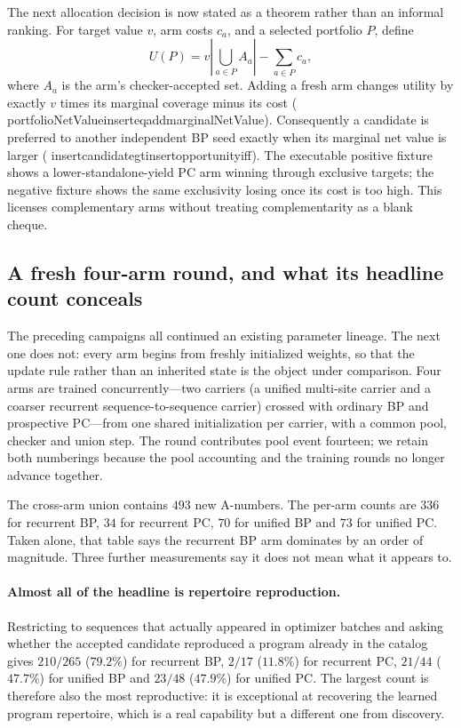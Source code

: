 \documentclass[11pt]{article}
\newcommand{\leanname}[1]{{\scriptsize\ttfamily
  \def\_{\textunderscore\allowbreak}#1}}
\begin{document}
The next allocation decision is now stated as a theorem rather than an informal ranking.
For target value $v$, arm costs $c_a$, and a selected portfolio $P$, define
\[
 U(P)=v\left|\bigcup_{a\in P}A_a\right|-\sum_{a\in P}c_a,
\]
where $A_a$ is the arm's checker-accepted set. Adding a fresh arm changes utility by
exactly $v$ times its marginal coverage minus its cost
(\leanname{portfolioNetValue\_insert\_eq\_add\_marginalNetValue}).
Consequently a candidate is preferred to another independent BP seed exactly when its
marginal net value is larger
(\leanname{insert\_candidate\_gt\_insert\_opportunity\_iff}).
The executable positive fixture shows a lower-standalone-yield PC arm winning through
exclusive targets; the negative fixture shows the same exclusivity losing once its cost
is too high. This licenses complementary arms without treating complementarity as a
blank cheque.

\subsection{A fresh four-arm round, and what its headline count conceals}
\label{sec:fresh-round-one}

The preceding campaigns all continued an existing parameter lineage. The next one does
not: every arm begins from freshly initialized weights, so that the update rule rather
than an inherited state is the object under comparison. Four arms are trained
concurrently---two carriers (a unified multi-site carrier and a coarser recurrent
sequence-to-sequence carrier) crossed with ordinary BP and prospective PC---from one
shared initialization per carrier, with a common pool, checker and union step. The
round contributes pool event fourteen; we retain both numberings because the pool
accounting and the training rounds no longer advance together.

The cross-arm union contains $493$ new A-numbers. The per-arm counts are $336$ for
recurrent BP, $34$ for recurrent PC, $70$ for unified BP and $73$ for unified PC. Taken
alone, that table says the recurrent BP arm dominates by an order of magnitude. Three
further measurements say it does not mean what it appears to.

\paragraph{Almost all of the headline is repertoire reproduction.}
Restricting to sequences that actually appeared in optimizer batches and asking whether
the accepted candidate reproduced a program already in the catalog gives $210/265$
($79.2\%$) for recurrent BP, $2/17$ ($11.8\%$) for recurrent PC, $21/44$ ($47.7\%$) for
unified BP and $23/48$ ($47.9\%$) for unified PC. The largest count is therefore also
the most reproductive: it is exceptional at recovering the learned program repertoire,
which is a real capability but a different one from discovery.
\end{document}

